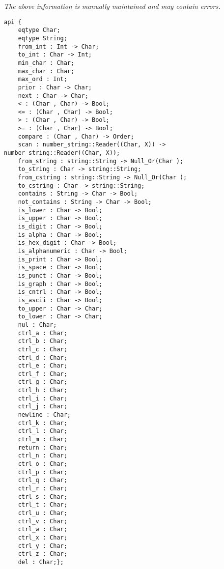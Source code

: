 \label{api:Char}

{\tiny \it The above information is manually maintained and may contain errors.}
\begin{verbatim}
api {
    eqtype Char;
    eqtype String;
    from_int : Int -> Char;
    to_int : Char -> Int;
    min_char : Char;
    max_char : Char;
    max_ord : Int;
    prior : Char -> Char;
    next : Char -> Char;
    < : (Char , Char) -> Bool;
    <= : (Char , Char) -> Bool;
    > : (Char , Char) -> Bool;
    >= : (Char , Char) -> Bool;
    compare : (Char , Char) -> Order;
    scan : number_string::Reader((Char, X)) -> number_string::Reader((Char, X));
    from_string : string::String -> Null_Or(Char );
    to_string : Char -> string::String;
    from_cstring : string::String -> Null_Or(Char );
    to_cstring : Char -> string::String;
    contains : String -> Char -> Bool;
    not_contains : String -> Char -> Bool;
    is_lower : Char -> Bool;
    is_upper : Char -> Bool;
    is_digit : Char -> Bool;
    is_alpha : Char -> Bool;
    is_hex_digit : Char -> Bool;
    is_alphanumeric : Char -> Bool;
    is_print : Char -> Bool;
    is_space : Char -> Bool;
    is_punct : Char -> Bool;
    is_graph : Char -> Bool;
    is_cntrl : Char -> Bool;
    is_ascii : Char -> Bool;
    to_upper : Char -> Char;
    to_lower : Char -> Char;
    nul : Char;
    ctrl_a : Char;
    ctrl_b : Char;
    ctrl_c : Char;
    ctrl_d : Char;
    ctrl_e : Char;
    ctrl_f : Char;
    ctrl_g : Char;
    ctrl_h : Char;
    ctrl_i : Char;
    ctrl_j : Char;
    newline : Char;
    ctrl_k : Char;
    ctrl_l : Char;
    ctrl_m : Char;
    return : Char;
    ctrl_n : Char;
    ctrl_o : Char;
    ctrl_p : Char;
    ctrl_q : Char;
    ctrl_r : Char;
    ctrl_s : Char;
    ctrl_t : Char;
    ctrl_u : Char;
    ctrl_v : Char;
    ctrl_w : Char;
    ctrl_x : Char;
    ctrl_y : Char;
    ctrl_z : Char;
    del : Char;};
\end{verbatim}
